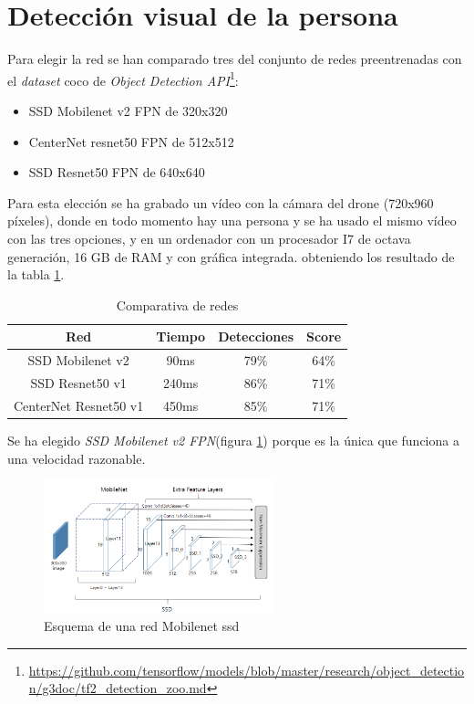 \section{Detección visual de la persona}
Para elegir la red se han comparado tres del conjunto de redes preentrenadas con el \textit{dataset} \acrshort{coco} de \textit{Object Detection API}\footnote{\url{https://github.com/tensorflow/models/blob/master/research/object_detection/g3doc/tf2_detection_zoo.md}}:
\begin{itemize}
  \item SSD Mobilenet v2 FPN de 320x320
  \item CenterNet resnet50 FPN de 512x512
  \item SSD Resnet50 FPN de 640x640
\end{itemize}
Para esta elección se ha grabado un vídeo con la cámara del drone (720x960 píxeles), donde en todo momento hay una persona y se ha usado el mismo vídeo con las tres opciones, y en un ordenador con un procesador I7 de octava generación, 16 GB de RAM y con gráfica integrada. obteniendo los resultado de la tabla \ref{tab:comparativa_redes}.
\begin{table}[H]
\centering
\begin{tabular}{|c|c|c|c|}
\hline
\textbf{Red}          & \textbf{Tiempo} & \textbf{Detecciones} & \textbf{Score} \\ \hline 
SSD Mobilenet v2      & 90ms            & 79\%        & 64\%           \\ \hline  
SSD Resnet50 v1       & 240ms           & 86\%        & 71\%           \\\hline  
CenterNet Resnet50 v1 & 450ms           & 85\%        & 71\%           \\ \hline 
\end{tabular}
\caption{Comparativa de redes}
\label{tab:comparativa_redes}
\end{table}
Se ha elegido \textit{SSD Mobilenet v2 FPN}(figura \ref{fig:mobilenet}) porque es la única que funciona a una velocidad razonable.
\begin{figure}[H]
  \begin{center}
    \includegraphics[width=0.6\textwidth]{figures/real/mobilenet.png}
		\caption{Esquema de una red Mobilenet ssd}
		\label{fig:mobilenet}
		\end{center}
\end{figure}
